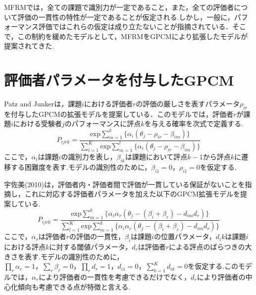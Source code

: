 \documentclass[a4paper,11pt,oneside,openany]{jsbook}
\begin{document}
MFRMでは，全ての課題で識別力が一定であること，また，全ての評価者について評価の一貫性の特性が一定であることが仮定される.しかし，一般に，パフォーマンス評価ではこれらの仮定は成り立たないことが指摘されている\cite{RashUsami,IRTUtoUeno}．そこで，この制約を緩めたモデルとして，MFRMをGPCMにより拡張したモデルが提案されてきた.

\section{評価者パラメータを付与したGPCM}
Patz and Junkerは，課題$i$における評価者$r$の評価の厳しさを表すパラメータ$\rho_{ir}$を付与したGPCMの拡張モデルを提案している\cite{raterGPCM}．このモデルでは，評価者$r$が課題$i$における受験者$j$のパフォーマンスに評点$k$を与える確率を次式で定義する.
\begin{displaymath}
P_{ijrk}=\frac{\mathrm{exp}\sum_{m=1}^{k}\{\alpha_i(\theta_{j}-\rho_{ir}-\beta_{im})\}}{\sum_{l=1}^{K}\mathrm{exp}\sum_{m=1}^{l}\{\alpha_i(\theta_{j}-\rho_{ir}-\beta_{im})\}}
\end{displaymath}
ここで，$\alpha_i$は課題$i$の識別力を表し，$\beta_{ik}$は課題において評点$k-1$から評点$k$に遷移する困難度を表す.モデルの識別性のために，$\beta_{i1}=0，\rho_{i1}=0$を仮定する.

宇佐美(2010)は，評価者内・評価者間で評価が一貫している保証がないことを指摘し，これに対応する評価者パラメータを加えた以下のGPCM拡張モデルを提案している.
\begin{displaymath}
P_{ijrk}=\frac{\mathrm{exp}\sum_{m=1}^{k}\{\alpha_i\alpha_r(\theta_{j}-(\beta_{i}+\beta_{r})-d_{im}d_r)\}}{\sum_{l=1}^{K}\mathrm{exp}\sum_{m=1}^{k}\{\alpha_i\alpha_r(\theta_{j}-(\beta_{i}+\beta_{r})-d_{im}d_r)\}}
\end{displaymath}
ここで，$\alpha_r$は評価者$r$の評価の一貫性，$\beta_i$は課題$i$の位置パラメータ，$d_ik$は課題$i$における評点$k$に対する閾値パラメータ，$d_r$は評価者$r$による評点のばらつきの大きさを表す.モデルの識別性のために，$\prod_{r}\alpha_r=1，\sum_{r}\beta_r=0，\prod_{r}d_r=1，d_{i1}=0，\sum_{k=1}^{K}d_{ik}=0$を仮定する.このモデルでは，$\alpha_r$により評価者の一貫性を考慮できるだけでなく，$d_r$により評価者の中心化傾向も考慮できる点が特徴と言える.
\end{document}
